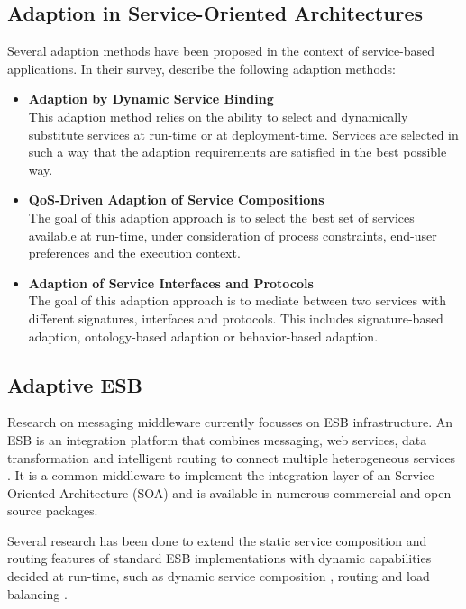 \subsection{Adaption in Service-Oriented Architectures}
Several adaption methods have been proposed in the context of service-based applications. In their survey, \cite{Kazhamiakin:2010ub} describe the following adaption methods:
\begin{itemize}
	\item \textbf{Adaption by Dynamic Service Binding}\\
	This adaption method relies on the ability to select and dynamically substitute services at run-time or at deployment-time. Services are selected in such a way that the adaption requirements are satisfied in the best possible way. 
	\item \textbf{\ac{QoS}-Driven Adaption of Service Compositions}\\
	The goal of this adaption approach is to select the best set of services available at run-time, under consideration of process constraints, end-user preferences and the execution context.
	\item \textbf{Adaption of Service Interfaces and Protocols}\\
	The goal of this adaption approach is to mediate between two services with different signatures, interfaces and protocols. This includes signature-based adaption, ontology-based adaption or behavior-based adaption.
\end{itemize}

\subsection{Adaptive ESB}

Research on messaging middleware currently focusses on \ac{ESB} infrastructure. An \ac{ESB} is an integration platform that combines messaging, web services, data transformation and intelligent routing to connect multiple heterogeneous services \citep{Chappell:2004jo}. It is a common middleware to implement the integration layer of an Service Oriented Architecture (SOA) and is available in numerous commercial and open-source packages.

Several research has been done to extend the static service composition and routing features of standard ESB implementations with dynamic capabilities decided at run-time, such as dynamic service composition \citep{Chang:2007aa}, routing \citep{Bai:2007aa} \citep{Wu:2008aa} \citep{Ziyaeva:2008aa} and load balancing \citep{Jongtaveesataporn:2010aa}.

